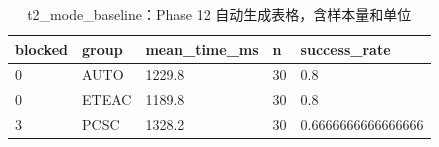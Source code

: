 \begin{table}[htbp]
\centering
\caption{t2_mode_baseline：Phase 12 自动生成表格，含样本量和单位}
\begin{tabular}{lllll}
\hline
blocked & group & mean_time_ms & n & success_rate \\
\hline
0 & AUTO & 1229.8 & 30 & 0.8 \\
0 & ETEAC & 1189.8 & 30 & 0.8 \\
3 & PCSC & 1328.2 & 30 & 0.6666666666666666 \\
\hline
\end{tabular}
\end{table}
